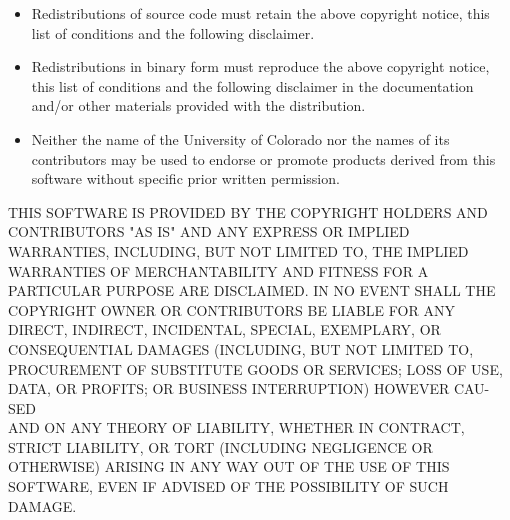 \documentclass[a4paper,10pt]{scrartcl}
\begin{document}
\begin{itemize}
\item
Redistributions of source code must retain the above copyright
notice, this list of conditions and the following disclaimer.
\item
Redistributions in binary form must reproduce the above copyright
notice, this list of conditions and the following disclaimer in the
documentation and/or other materials provided with the distribution.
\item
Neither the name of the University of Colorado nor the names of its
contributors may be used to endorse or promote products derived from
this software without specific prior written permission.
\end{itemize}
THIS SOFTWARE IS PROVIDED BY THE COPYRIGHT HOLDERS AND CONTRIBUTORS
"AS IS" AND ANY EXPRESS OR IMPLIED WARRAN\-TIES, INCLUDING, BUT NOT
LIMITED TO, THE IMPLIED WARRANTIES OF MERCHANTABILITY AND FITNESS
FOR A PARTICULAR PURPOSE ARE DISCLAIMED. IN NO EVENT SHALL THE
COPYRIGHT OWNER OR CONTRIBUTORS BE LIABLE FOR ANY DIRECT, INDIRECT,
INCIDENTAL, SPECIAL, EXEMPLARY, OR CONSEQUENTIAL DAMAGES (INCLUDING,
BUT NOT LIMITED TO, PROCUREMENT OF SUBSTITUTE GOODS OR SERVICES;
LOSS OF USE, DATA, OR PROFITS; OR BUSINESS INTERRUPTION) HOWEVER
CAU-SED
\\ AND ON ANY THEORY OF LIABILITY, WHETHER IN CONTRACT, STRICT
LIABILITY, OR TORT (INCLUDING NEGLIGENCE OR OTHERWISE) ARISING IN
ANY WAY OUT OF THE USE OF THIS SOFTWARE, EVEN IF ADVISED OF THE
POSSIBILITY OF SUCH DAMAGE.




\end{document}
